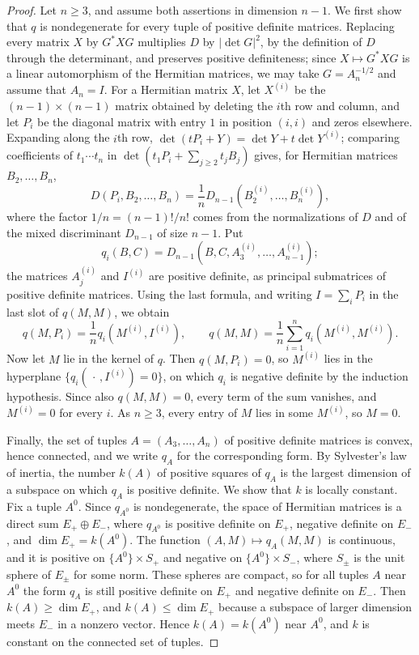 \begin{proof}
Let $n\geq3$, and assume both assertions in dimension $n-1$. We first show that $q$ is nondegenerate for every tuple of positive definite matrices. Replacing every matrix $X$ by $G^*XG$ multiplies $D$ by $|\det G|^2$, by the definition of $D$ through the determinant, and preserves positive definiteness; since $X\mapsto G^*XG$ is a linear automorphism of the Hermitian matrices, we may take $G=A_n^{-1/2}$ and assume that $A_n=I$. For a Hermitian matrix $X$, let $X^{(i)}$ be the $(n-1)\times(n-1)$ matrix obtained by deleting the $i$th row and column, and let $P_i$ be the diagonal matrix with entry $1$ in position $(i,i)$ and zeros elsewhere. Expanding along the $i$th row, $\det(tP_i+Y)=\det Y+t\det Y^{(i)}$; comparing coefficients of $t_1\cdots t_n$ in $\det(t_1P_i+\sum_{j\geq2}t_jB_j)$ gives, for Hermitian matrices $B_2,\ldots,B_n$,
\[
 D(P_i,B_2,\ldots,B_n)=\frac1nD_{n-1}(B_2^{(i)},\ldots,B_n^{(i)}),
\]
where the factor $1/n=(n-1)!/n!$ comes from the normalizations of $D$ and of the mixed discriminant $D_{n-1}$ of size $n-1$. Put
\[
 q_i(B,C)=D_{n-1}(B,C,A_3^{(i)},\ldots,A_{n-1}^{(i)});
\]
the matrices $A_j^{(i)}$ and $I^{(i)}$ are positive definite, as principal submatrices of positive definite matrices. Using the last formula, and writing $I=\sum_iP_i$ in the last slot of $q(M,M)$, we obtain
\[
 q(M,P_i)=\frac1nq_i(M^{(i)},I^{(i)}),\qquad
 q(M,M)=\frac1n\sum_{i=1}^nq_i(M^{(i)},M^{(i)}).
\]
Now let $M$ lie in the kernel of $q$. Then $q(M,P_i)=0$, so $M^{(i)}$ lies in the hyperplane $\{q_i(\,\cdot\,,I^{(i)})=0\}$, on which $q_i$ is negative definite by the induction hypothesis. Since also $q(M,M)=0$, every term of the sum vanishes, and $M^{(i)}=0$ for every $i$. As $n\geq3$, every entry of $M$ lies in some $M^{(i)}$, so $M=0$.

Finally, the set of tuples $A=(A_3,\ldots,A_n)$ of positive definite matrices is convex, hence connected, and we write $q_A$ for the corresponding form. By Sylvester's law of inertia, the number $k(A)$ of positive squares of $q_A$ is the largest dimension of a subspace on which $q_A$ is positive definite. We show that $k$ is locally constant. Fix a tuple $A^0$. Since $q_{A^0}$ is nondegenerate, the space of Hermitian matrices is a direct sum $E_+\oplus E_-$, where $q_{A^0}$ is positive definite on $E_+$, negative definite on $E_-$, and $\dim E_+=k(A^0)$. The function $(A,M)\mapsto q_A(M,M)$ is continuous, and it is positive on $\{A^0\}\times S_+$ and negative on $\{A^0\}\times S_-$, where $S_\pm$ is the unit sphere of $E_\pm$ for some norm. These spheres are compact, so for all tuples $A$ near $A^0$ the form $q_A$ is still positive definite on $E_+$ and negative definite on $E_-$. Then $k(A)\geq\dim E_+$, and $k(A)\leq\dim E_+$ because a subspace of larger dimension meets $E_-$ in a nonzero vector. Hence $k(A)=k(A^0)$ near $A^0$, and $k$ is constant on the connected set of tuples.


\end{proof}
